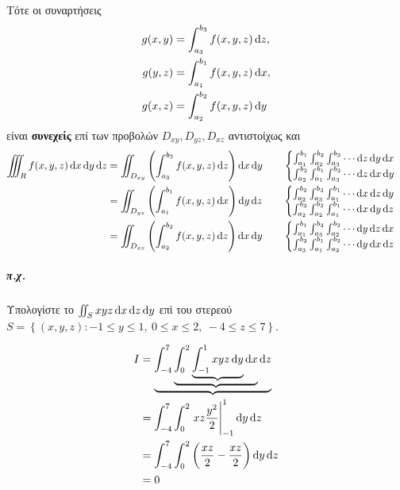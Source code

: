 \documentclass[11pt,a4paper,titlepage]{article}
\begin{document}
Τότε οι συναρτήσεις
\begin{align*}
g(x,y)&=\int_{a_3}^{b_3}f(x,y,z)\dif z,\\
g(y,z)&=\int_{a_1}^{b_1}f(x,y,z)\dif x,\\
g(x,z)&=\int_{a_2}^{b_2}f(x,y,z)\dif y
\end{align*}
είναι \textbf{συνεχείς} επί των προβολών \(D_{xy},D_{yz},D_{xz}\) αντιστοίχως και
\begin{align*}
\iiint_R f(x,y,z)\dif x \dif y \dif z & =
\iint_{D_{xy}} \left(
\int_{a_3}^{b_3} f(x,y,z) \dif z
\right) \dif x \dif y  \qquad
\begin{cases}
\int_{a_1}^{b_1}\int_{a_2}^{b_2}\int_{a_3}^{b_3} \cdots \dif z \dif y \dif x\\
\int_{a_2}^{b_2}\int_{a_1}^{b_1}\int_{a_3}^{b_3} \cdots \dif z \dif x \dif y
\end{cases}
\\
& =
\iint_{D_{yz}} \left(
\int_{a_1}^{b_1} f(x,y,z) \dif x
\right) \dif y \dif z \qquad \begin{cases}
\int_{a_2}^{b_2}\int_{a_3}^{b_3}\int_{a_1}^{b_1} \cdots \dif x \dif z \dif y\\
\int_{a_2}^{b_3}\int_{a_2}^{b_2}\int_{a_1}^{b_1} \cdots \dif x \dif y \dif z
\end{cases}\\
& =
\iint_{D_{xz}} \left(
\int_{a_2}^{b_2} f(x,y,z) \dif z
\right) \dif x \dif y \qquad
\begin{cases}
\int_{a_1}^{b_1}\int_{a_3}^{b_3}\int_{a_2}^{b_2} \cdots \dif y \dif z \dif x\\
\int_{a_3}^{b_3}\int_{a_1}^{b_1}\int_{a_2}^{b_2} \cdots \dif y \dif x \dif z
\end{cases}
\end{align*}

\subparagraph{π.χ.}
Υπολογίστε το \(\iint_S xyz \dif x \dif z \dif y\) επί του στερεού \(S= \left\lbrace (x,y,z): -1 \leq y \leq 1,\ 0\leq x \leq 2,\ -4 \leq z \leq 7  \right\rbrace\).

\begin{align*}
I &= \underbrace{\int_{-4}^7 \underbrace{\int_0^2 \underbrace{\int_{-1}^1 x y z \dif y} \dif x} \dif z}\\
&= \int_{-4}^7 \int_0^2 \left. xz \frac{y^2}{2}\right|_{-1}^1 \dif y \dif z\\
&= \int_{-4}^7 \int_0^2 \left( \frac{xz}{2} - \frac{xz}{2}\right) \dif y \dif z\\
&= 0
\end{align*}
\end{document}
